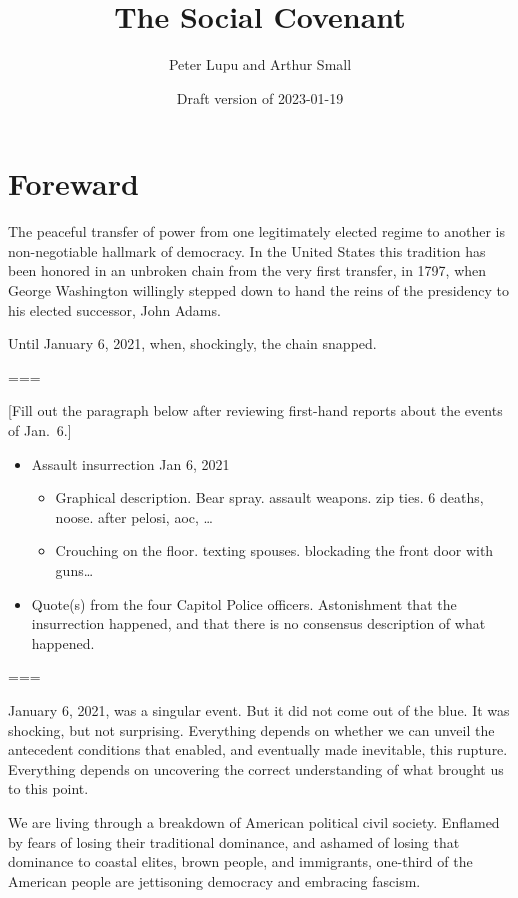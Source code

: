 \documentclass[
]{book}
\title{The Social Covenant}
\author{Peter Lupu and Arthur Small}
\date{Draft version of 2023-01-19}
\providecommand{\tightlist}{%
  \setlength{\itemsep}{0pt}\setlength{\parskip}{0pt}}
\begin{document}
\maketitle

{
\setcounter{tocdepth}{1}
\tableofcontents
}
\hypertarget{foreward}{%
\chapter*{Foreward}\label{foreward}}

The peaceful transfer of power from one legitimately elected regime to another is non-negotiable hallmark of democracy. In the United States this tradition has been honored in an unbroken chain from the very first transfer, in 1797, when George Washington willingly stepped down to hand the reins of the presidency to his elected successor, John Adams.

Until January 6, 2021, when, shockingly, the chain snapped.

===

{[}Fill out the paragraph below after reviewing first-hand reports about the events of Jan.~6.{]}

\begin{itemize}
\tightlist
\item
  Assault insurrection Jan 6, 2021

  \begin{itemize}
  \tightlist
  \item
    Graphical description. Bear spray. assault weapons. zip ties. 6 deaths, noose. after pelosi, aoc, \ldots{}
  \item
    Crouching on the floor. texting spouses. blockading the front door with guns\ldots{}
  \end{itemize}
\item
  Quote(s) from the four Capitol Police officers. Astonishment that the insurrection happened, and that there is no consensus description of what happened.
\end{itemize}

===

January 6, 2021, was a singular event. But it did not come out of the blue. It was shocking, but not surprising. Everything depends on whether we can unveil the antecedent conditions that enabled, and eventually made inevitable, this rupture. Everything depends on uncovering the correct understanding of what brought us to this point.

We are living through a breakdown of American political civil society. Enflamed by fears of losing their traditional dominance, and ashamed of losing that dominance to coastal elites, brown people, and immigrants, one-third of the American people are jettisoning democracy and embracing fascism.
\end{document}
